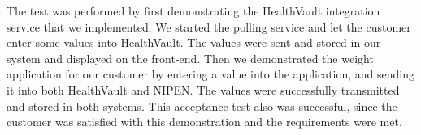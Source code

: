 The test was performed by first demonstrating the HealthVault integration service that we implemented.
We started the polling service and let the customer enter some values into HealthVault.
The values were sent and stored in our system and displayed on the front-end.
Then we demonstrated the weight application for our customer by entering a value into the application, and sending it into both HealthVault and NIPEN.
The values were successfully transmitted and stored in both systems.
This acceptance test also was successful, since the customer was satisfied with this demonstration and the requirements were met.